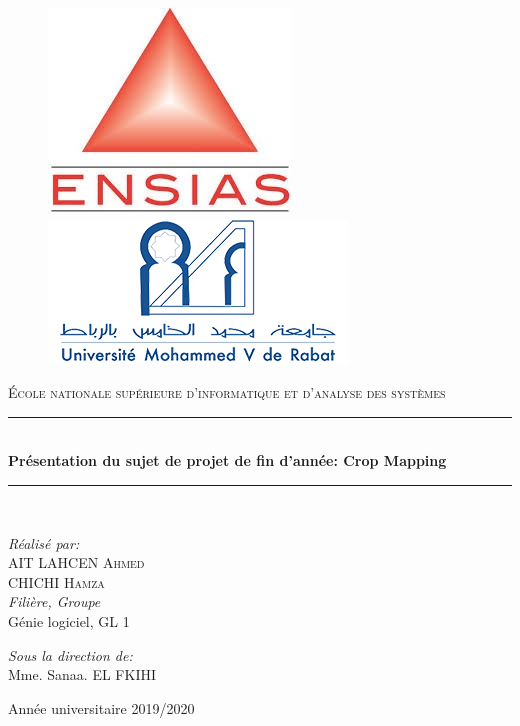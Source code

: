 \documentclass[12pt, openany]{report}
\newcommand{\HRule}{\rule{\linewidth}{0.5mm}}
\begin{document}
\begin{titlepage}
  \begin{sffamily}
  \begin{center}

	\begin{figure}[t]
	   \begin{minipage}{0.48\textwidth } 
	     \includegraphics[width=.3\linewidth , left]{ensias.JPG}
	   \end{minipage}\hfill
	   \begin{minipage}{0.48\textwidth }
	     \includegraphics[width=.4\linewidth , right]{univesite.JPG}
	   \end{minipage}
	\end{figure}
     
    \textsc{\LARGE École nationale supérieure d'informatique et d'analyse des systèmes}\\[4cm]


    \HRule \\[0.5cm]
    { \huge \bfseries Présentation du sujet de projet de fin d'année: Crop Mapping\\[0.4cm] }
	\HRule\\[4cm]

    \begin{minipage}{0.4\textwidth}
      \begin{flushleft} \large
        \emph{Réalisé par:}\\
        AIT LAHCEN \textsc{Ahmed}\\
	CHICHI \textsc{Hamza}\\
       \emph{Filière, Groupe}\\
	Génie logiciel, GL 1\\
      \end{flushleft}
    \end{minipage}
    \begin{minipage}{0.4\textwidth}
      \begin{flushright} \large
       \emph{Sous la direction de:}\\
	Mme. Sanaa. \textsc{EL FKIHI}\\
	\end{flushright}
    \end{minipage}

    \vfill

    {\large Année universitaire 2019/2020}

  \end{center}
  \end{sffamily}
\end{titlepage}
\end{document}
